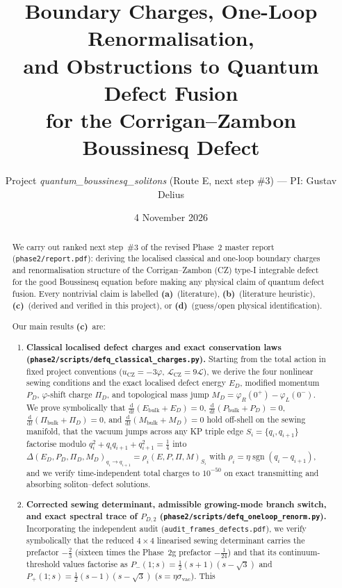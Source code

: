 \documentclass[11pt,a4paper]{article}
\title{\textbf{Boundary Charges, One-Loop Renormalisation,\\
and Obstructions to Quantum Defect Fusion\\
for the Corrigan--Zambon Boussinesq Defect}}
\author{Project \emph{quantum\_boussinesq\_solitons} (Route E, next step \#3) --- PI: Gustav Delius}
\date{4 November 2026}
\newcommand{\La}{\textsf{\textbf{(a)}}}
\newcommand{\Lb}{\textsf{\textbf{(b)}}}
\newcommand{\Lc}{\textsf{\textbf{(c)}}}
\newcommand{\Ld}{\textsf{\textbf{(d)}}}
\newcommand{\dd}{\mathrm{d}}
\newcommand{\sgn}{\operatorname{sgn}}
\newcommand{\sclass}{\texttt{phase2/\allowbreak scripts/\allowbreak defq\_\allowbreak classical\_\allowbreak charges.py}}
\newcommand{\sren}{\texttt{phase2/\allowbreak scripts/\allowbreak defq\_\allowbreak oneloop\_\allowbreak renorm.py}}
\theoremstyle{remark}
\begin{document}
\maketitle

\begin{abstract}
We carry out ranked next step~\#3 of the revised Phase~2 master report
(\texttt{phase2/\allowbreak report.pdf}): deriving the localised classical and one-loop
boundary charges and renormalisation structure of the Corrigan--Zambon (CZ)
type-I integrable defect \cite{CZ} for the good Boussinesq equation before
making any physical claim of quantum defect fusion. Every nontrivial claim is
labelled \La\ (literature), \Lb\ (literature heuristic), \Lc\ (derived and
verified in this project), or \Ld\ (guess/open physical identification).

Our main results \Lc\ are:
\begin{enumerate}
\item \textbf{Classical localised defect charges and exact conservation laws (\sclass).}
Starting from the total action in fixed project conventions ($u_{\mathrm{CZ}}=-3\varphi$,
$\mathcal{L}_{\mathrm{CZ}}=9\mathcal{L}$), we derive the four nonlinear sewing
conditions and the exact localised defect energy $E_D$, modified momentum $P_D$,
$\varphi$-shift charge $\Pi_D$, and topological mass jump $M_D = \varphi_R(0^+)-\varphi_L(0^-)$.
We prove symbolically that $\frac{\dd}{\dd t}(E_{\mathrm{bulk}}+E_D)=0$,
$\frac{\dd}{\dd t}(P_{\mathrm{bulk}}+P_D)=0$,
$\frac{\dd}{\dd t}(\Pi_{\mathrm{bulk}}+\Pi_D)=0$, and
$\frac{\dd}{\dd t}(M_{\mathrm{bulk}}+M_D)=0$ hold off-shell on the sewing
manifold, that the vacuum jumps across any KP triple edge $S_i=\{q_i,q_{i+1}\}$
factorise modulo $q_i^2+q_i q_{i+1}+q_{i+1}^2=\frac{1}{4}$ into
$\Delta(E_D,P_D,\Pi_D,M_D)_{q_i\to q_{i+1}} = \rho_i(E,P,\Pi,M)_{S_i}$ with
$\rho_i = \eta\sgn(q_i-q_{i+1})$, and we verify time-independent total charges
to $10^{-50}$ on exact transmitting and absorbing soliton--defect solutions.
\item \textbf{Corrected sewing determinant, admissible growing-mode branch switch, and exact spectral trace of $P_{D,2}$ (\sren).}
Incorporating the independent audit (\texttt{audit\_frames\_defects.pdf}), we
verify symbolically that the reduced $4\times 4$ linearised sewing determinant
carries the prefactor $-\frac{2}{3}$ (sixteen times the Phase~2g prefactor
$-\frac{1}{24}$) and that its continuum-threshold values factorise as
$P_-(1;s)=\frac{1}{2}(s+1)(s-\sqrt{3})$ and
$P_+(1;s)=\frac{1}{2}(s-1)(s-\sqrt{3})$ ($s=\eta\sigma_{\mathrm{vac}}$). This

\end{enumerate}
\end{abstract}
\end{document}
